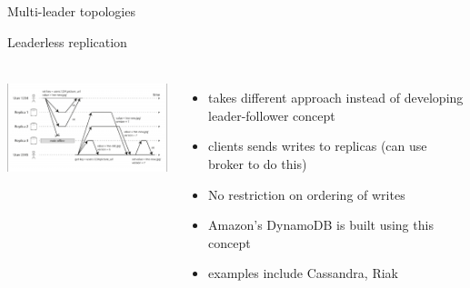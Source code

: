 \documentclass[9pt]{beamer}
\begin{document}

\begin{frame}{Multi-leader topologies}
\end{frame}


\begin{frame}{Leaderless replication}
  \begin{columns}
    \includegraphics[width=70mm, height=30mm, scale=0.1]{img/replica/leader_less_replication_flow.png}

    \begin{itemize}
      \pause
      \item takes different approach instead of developing leader-follower concept
      \pause
      \item clients sends writes to replicas (can use broker to do this)
      \pause
      \item No restriction on ordering of writes
        \pause
      \item Amazon's DynamoDB is built using this concept
      \item examples include Cassandra, Riak 
    \end{itemize}
  \end{columns}
  

\end{frame}

\end{document}
